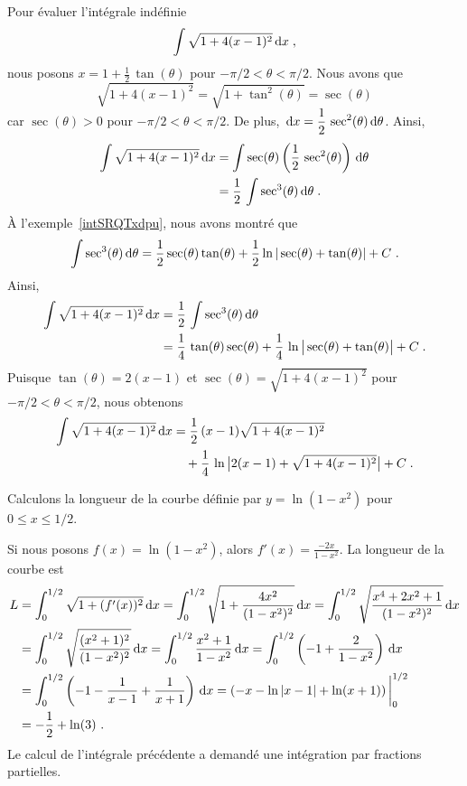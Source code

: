 {\begin{egg}
Pour évaluer l'intégrale indéfinie
\[
\int \sqrt{1+4(x-1)^2} \,\mathrm{d}x \; ,
\]
nous posons $\displaystyle x = 1 + \frac{1}{2}\, \tan(\theta)$ pour
$-\pi/2<\theta<\pi/2$.  Nous avons que
\[
\sqrt{1+4(x-1)^2} = \sqrt{1+\tan^2(\theta)} = \sec(\theta)
\]
car $\sec(\theta)>0$ pour $-\pi/2<\theta<\pi/2$.  De plus,
$\displaystyle \,\mathrm{d}x = \frac{1}{2} \,\sec^2(\theta) \,\mathrm{d}\theta$.
Ainsi,
\begin{align*}
\int \sqrt{1+4(x-1)^2} \,\mathrm{d}x &= \int \sec(\theta)
\left(\frac{1}{2}\, \sec^2(\theta) \right) \,\mathrm{d}\theta \\
&= \frac{1}{2}\, \int \sec^3(\theta) \,\mathrm{d}\theta \; .
\end{align*}
À l'exemple~\ref{intSRQTxdpu}, nous avons montré que
\[
\int \sec^3(\theta) \,\mathrm{d}\theta = \frac{1}{2} \sec(\theta) \tan(\theta)
+ \frac{1}{2} \ln|\sec(\theta)+\tan(\theta)| + C \ .
\]
Ainsi,
\begin{align*}
\int \sqrt{1+4(x-1)^2} \,\mathrm{d}x
&= \frac{1}{2}\, \int \sec^3(\theta) \,\mathrm{d}\theta \\
&= \frac{1}{4}\,\tan(\theta)\sec(\theta)
+ \frac{1}{4}\, \ln \big| \sec(\theta) + \tan(\theta) \big| + C \; .
\end{align*}
Puisque $\displaystyle \tan(\theta) = 2(x-1)$ et
$\displaystyle \sec(\theta) = \sqrt{ 1 + 4(x-1)^2}$ pour
$-\pi/2<\theta<\pi/2$, nous obtenons
\begin{align*}
\int \sqrt{1+4(x-1)^2} \,\mathrm{d}x & = \frac{1}{2}\,(x - 1)\sqrt{ 1 + 4(x-1)^2} \\
& \quad + \frac{1}{4}\, \ln \big|2(x - 1) + \sqrt{ 1 + 4(x-1)^2} \big| + C \; .
\end{align*}
\end{egg}


\begin{egg}
Calculons la longueur de la courbe définie par
$y = \ln(1-x^2)$ pour $0\leq x \leq 1/2$.

Si nous posons $f(x) = \ln(1-x^2)$, alors
$\displaystyle f'(x) = \frac{-2x}{1-x^2}$.  La longueur de la courbe
est
\begin{align*}
L &= \int_0^{1/2} \sqrt{1+(f'(x))^2} \,\mathrm{d}x
= \int_0^{1/2} \sqrt{1+\frac{4x^2}{(1-x^2)^2}} \,\mathrm{d}x
= \int_0^{1/2} \sqrt{\frac{x^4+2x^2+1}{(1-x^2)^2}} \,\mathrm{d}x \\
&= \int_0^{1/2} \sqrt{\frac{(x^2+1)^2}{(1-x^2)^2}} \,\mathrm{d}x
= \int_0^{1/2} \frac{x^2+1}{1-x^2} \,\mathrm{d}x
= \int_0^{1/2} \left( -1 + \frac{2}{1-x^2}\right) \,\mathrm{d}x \\
&= \int_0^{1/2} \left( -1 -\frac{1}{x-1} + \frac{1}{x+1}\right) \,\mathrm{d}x
= \left( -x - \ln|x-1| + \ln(x+1) \right)\bigg|_0^{1/2} \\
&= -\frac{1}{2} + \ln(3) \ .
\end{align*}
Le calcul de l'intégrale précédente a demandé une intégration par
fractions partielles.
\end{egg}

}
